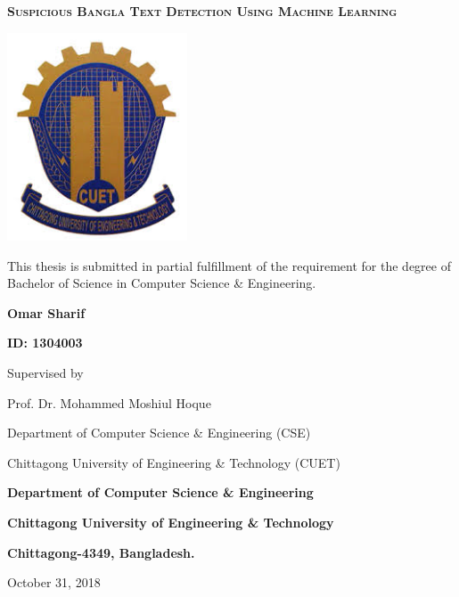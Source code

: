 \begin{titlepage}
	\centering
	{\scshape\Large\bfseries Suspicious Bangla Text Detection Using Machine Learning\par}
	\vspace{1cm}
	\includegraphics[width=0.4\textwidth]{Figures/Logo.jpeg}\par\vspace{1cm}
	\vspace{1cm}
	 This thesis is submitted in partial fulfillment of the requirement for the degree of Bachelor of Science in Computer Science \& Engineering.
	
	\vspace{2cm}
	\textbf{Omar Sharif}\par 
	\vspace{.5cm}
	\textbf{ID: 1304003}\par 
	
	\vspace{2cm}
	Supervised by\par 
	Prof. Dr. Mohammed Moshiul Hoque\par 
	Department of Computer Science \& Engineering (CSE)\par 
	Chittagong University of Engineering \& Technology (CUET)
	
	\vspace{1.5cm}
	{\Large\bfseries Department of Computer Science \& Engineering\par}
	{\large\bfseries Chittagong University of Engineering \& Technology\par}
	{\bfseries Chittagong-4349, Bangladesh.}

	\vfill
	{\large October 31, 2018\par}
\end{titlepage}

\setcounter{secnumdepth}{-1}

